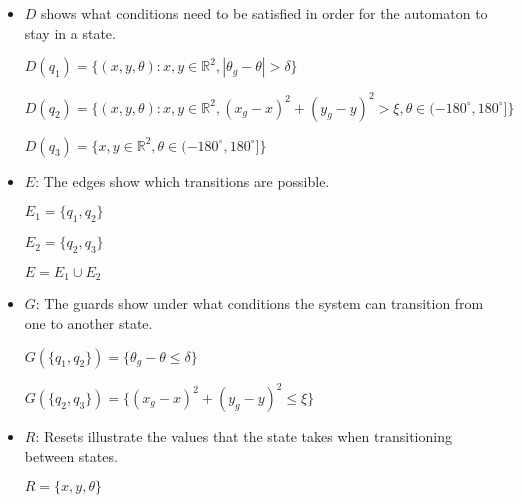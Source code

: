 \begin{itemize}
\item
  $D$ shows what conditions need to be satisfied in order for the automaton to
  stay in a state.

  $D(q_1)=\{(x,y,\theta): x,y \in \mathbb{R}^2, |\theta_g-\theta| > \delta\}$

  $D(q_2)=\{(x,y,\theta): x,y \in \mathbb{R}^2, (x_g-x)^2+(y_g-y)^2>\xi, \theta \in(-180^{\circ}, 180^{\circ}]\}$

  $D(q_3)= \{x,y \in \mathbb{R}^2, \theta \in(-180^{\circ}, 180^{\circ}] \}$

\item
  $E$: The edges show which transitions are possible.

  $E_1 = \{ q_1,q_2\}$

  $E_2 = \{ q_2,q_3\}$

  $E = E_1 \cup E_2$

\item
  $G$: The guards show under what conditions the system can transition from one to
  another state.

  $G(\{q_1,q_2\})=\{\theta_g-\theta\le \delta \}$

  $G(\{q_2,q_3\})=\{(x_g-x)^2+(y_g-y)^2 \leq \xi\}$

\item
  $R$: Resets illustrate the values that the state takes when transitioning
  between states.

  $R=\{x,y,\theta\}$

\end{itemize}
